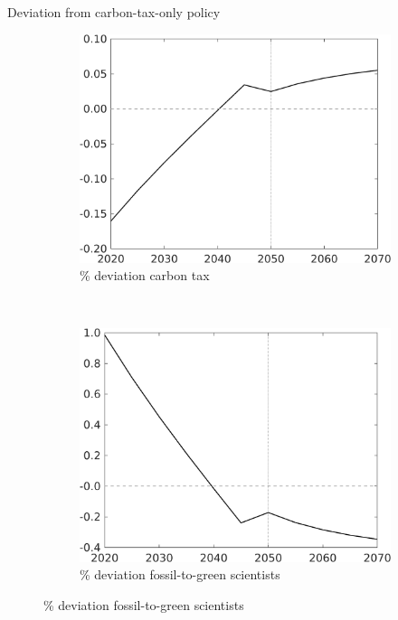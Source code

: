 \documentclass[11pt,aspectratio=169]{beamer}
\begin{document}
\begin{frame}{Deviation from carbon-tax-only policy}
\hypertarget{mec0}{}
\vspace{-3mm}
\pause
\centering
\begin{figure}
	\begin{subfigure}{0.42\textwidth}
		\caption{{\% deviation carbon tax}}
		\includegraphics[width=1\textwidth]{../codding_model/own_basedOnFried/optimalPol_010922_revision/figures/all_13Sept22_Tplus30/Tauf_OPT_T_NoTaus_COMPtaulPer_regime4_spillover0_knspil0_noskill0_sep0_xgrowth0_PV1_etaa0.79.png}
	\end{subfigure}
	\begin{minipage}[]{0.1\textwidth}
		\
	\end{minipage}
	\begin{subfigure}{0.4\textwidth}
		\caption{{\% deviation fossil-to-green scientists }}
		\includegraphics[width=1\textwidth]{../codding_model/own_basedOnFried/optimalPol_010922_revision/figures/all_13Sept22_Tplus30/sffsg_OPT_T_NoTaus_COMPtaulPer_regime4_spillover0_knspil0_noskill0_sep0_xgrowth0_PV1_etaa0.79.png}

\end{subfigure}
\end{figure}
\end{frame}
\end{document}
